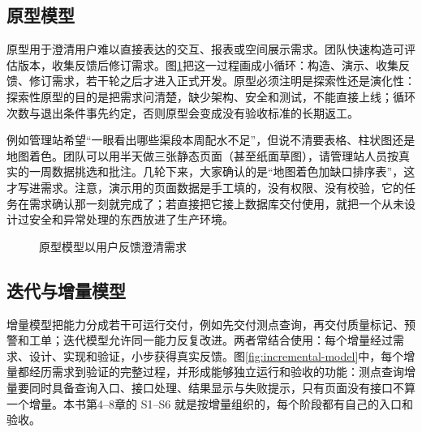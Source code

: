 \subsection{原型模型}

原型用于澄清用户难以直接表达的交互、报表或空间展示需求。团队快速构造可评估版本，收集反馈后修订需求。图\ref{fig:prototype-model}把这一过程画成小循环：构造、演示、收集反馈、修订需求，若干轮之后才进入正式开发。原型必须注明是探索性还是演化性：探索性原型的目的是把需求问清楚，缺少架构、安全和测试，不能直接上线；循环次数与退出条件事先约定，否则原型会变成没有验收标准的长期返工。

例如管理站希望“一眼看出哪些渠段本周配水不足”，但说不清要表格、柱状图还是地图着色。团队可以用半天做三张静态页面（甚至纸面草图），请管理站人员按真实的一周数据挑选和批注。几轮下来，大家确认的是“地图着色加缺口排序表”，这才写进需求。注意，演示用的页面数据是手工填的，没有权限、没有校验，它的任务在需求确认那一刻就完成了；若直接把它接上数据库交付使用，就把一个从未设计过安全和异常处理的东西放进了生产环境。

\begin{figure}[htbp]
\centering
{}
\caption{原型模型以用户反馈澄清需求}
\label{fig:prototype-model}
\end{figure}

\subsection{迭代与增量模型}

增量模型把能力分成若干可运行交付，例如先交付测点查询，再交付质量标记、预警和工单；迭代模型允许同一能力反复改进。两者常结合使用：每个增量经过需求、设计、实现和验证，小步获得真实反馈。图\ref{fig:incremental-model}中，每个增量都经历需求到验证的完整过程，并形成能够独立运行和验收的功能：测点查询增量要同时具备查询入口、接口处理、结果显示与失败提示，只有页面没有接口不算一个增量。本书第4--8章的 S1--S6 就是按增量组织的，每个阶段都有自己的入口和验收。

